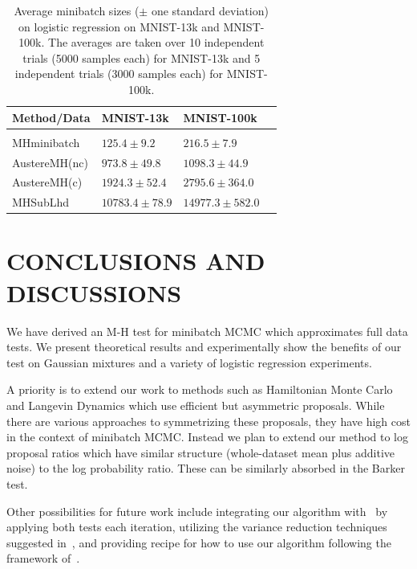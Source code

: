 \documentclass[letterpaper]{article}
\begin{document}
\begin{table}[t]
\caption{Average minibatch sizes ($\pm$ one standard deviation) on logistic
regression on MNIST-13k and MNIST-100k.  The averages are taken over 10
independent trials (5000 samples each) for MNIST-13k and 5 independent trials
(3000 samples each) for MNIST-100k.}
\small %
\label{tab:logistic}
\vskip 0.15in
\begin{center}
\begin{tabular}{l l l l}
\textbf{Method/Data} & \textbf{MNIST-13k} & \textbf{MNIST-100k}  \\
\hline \\
{\sc MHminibatch}   & $125.4\pm 9.2$    & $216.5 \pm 7.9$ \\
{\sc AustereMH(nc)} & $973.8\pm 49.8$   & $1098.3 \pm 44.9$ \\
{\sc AustereMH(c)}  & $1924.3\pm 52.4$  & $2795.6 \pm 364.0$ \\
{\sc MHSubLhd}      & $10783.4\pm 78.9$ & $14977.3 \pm 582.0$ \\
\end{tabular}
\end{center}
\vskip -0.1in
\end{table}


\section{CONCLUSIONS AND DISCUSSIONS}\label{sec:conclusion}

We have derived an M-H test for minibatch MCMC which approximates full data
tests. We present theoretical results and experimentally show the benefits of
our test on Gaussian mixtures and a variety of logistic regression experiments.

A priority is to extend our work to methods such as Hamiltonian Monte Carlo and Langevin Dynamics
which use efficient but asymmetric proposals. While there are various approaches
to symmetrizing these proposals, they have high cost in the context of minibatch
MCMC. Instead we plan to extend our method to log proposal ratios which have
similar structure (whole-dataset mean plus additive noise) to the log probability
ratio. These can be similarly absorbed in the Barker test. 

Other possibilities for future work include integrating our algorithm
with~\citep{cutting_mh_2014} by applying both tests each iteration, utilizing
the variance reduction techniques suggested in~\citep{DBLP:conf/icml/ChenG16},
and providing recipe for how to use our algorithm following the framework
of~\citep{sgmcmc_2015}.
\end{document}
